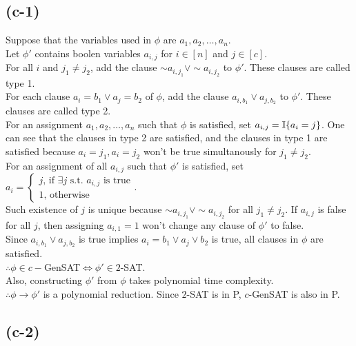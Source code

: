 \subsection*{(c-1)}

Suppose that the variables used in $\phi$ are $a_1, a_2, \dots, a_n$.\\
Let $\phi'$ contains boolen variables $a_{i, j}$ for $i\in[n]$ and $j\in[c]$.\\
For all $i$ and $j_1\neq j_2$, add the clause $\sim a_{i, j_1}\lor\sim a_{i, j_2}$ to $\phi'$. These clauses are called type 1.\\
For each clause $a_i=b_1\lor a_j=b_2$ of $\phi$, add the clause $a_{i, b_1}\lor a_{j, b_2}$ to $\phi'$. These clauses are called type 2.\\
For an assignment $a_1, a_2, \dots, a_n$ such that $\phi$ is satisfied, set $a_{i, j}=\mathbb{I}\{a_i=j\}$. One can see that the clauses in type 2 are satisfied, and the clauses in type 1 are satisfied because $a_i=j_1, a_i=j_2$ won't be true simultanously for $j_1\neq j_2$.\\
For an assignment of all $a_{i, j}$ such that $\phi'$ is satisfied, set $a_i=\begin{cases}
j\text{, if }\exists j\text{ s.t. }a_{i, j}\text{ is true}\\
1\text{, otherwise}
\end{cases}$.\\
Such existence of $j$ is unique because $\sim a_{i, j_1}\lor\sim a_{i, j_2}$ for all $j_1\neq j_2$. If $a_{i, j}$ is false for all $j$, then assigning $a_{i, 1}=1$ won't change any clause of $\phi'$ to false.\\
Since $a_{i, b_1}\lor a_{j, b_2}$ is true implies $a_i=b_1\lor a_j\lor b_2$ is true, all clauses in $\phi$ are satisfied.\\
$\therefore\phi\in c-$GenSAT$\iff\phi'\in2$-SAT.\\
Also, constructing $\phi'$ from $\phi$ takes polynomial time complexity.\\
$\therefore\phi\to\phi'$ is a polynomial reduction. Since $2$-SAT is in P, $c$-GenSAT is also in P.

\subsection*{(c-2)}

